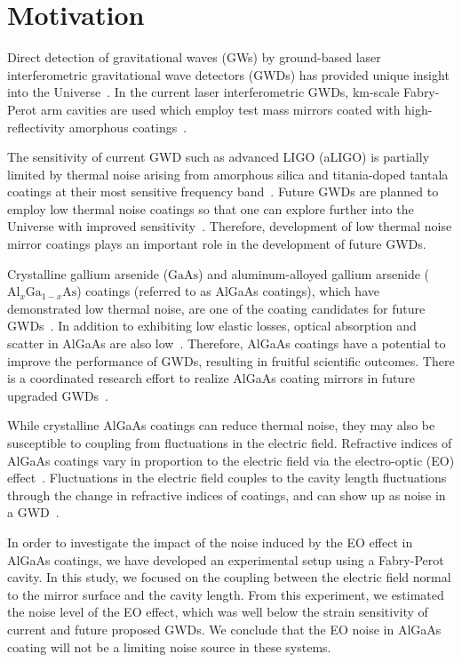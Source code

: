 \section{Motivation}
Direct detection of gravitational waves (GWs) by ground-based laser interferometric gravitational wave detectors (GWDs) has provided unique insight into the Universe~\cite{Abbott2016, gw170817, Abbott2021}.
In the current laser interferometric GWDs, km-scale Fabry-Perot arm cavities are used which employ test mass mirrors coated with high-reflectivity amorphous coatings~\cite{Degallaix2019, Granata2020}.

The sensitivity of current GWD such as advanced LIGO (aLIGO) is partially limited by thermal noise arising from amorphous silica and titania-doped tantala coatings at their most sensitive frequency band~\cite{harry:2006, Gras2018}.
Future GWDs are planned to employ low thermal noise coatings so that one can explore further into the Universe with improved sensitivity~\cite{Punturo_2010, Adhikari2020, CEHS, Srivastava2022}.
Therefore, development of low thermal noise mirror coatings plays an important role in the development of future GWDs.

Crystalline gallium arsenide ($\mathrm{GaAs}$) and aluminum-alloyed gallium arsenide ($\mathrm{Al}_{x}\mathrm{Ga}_{1-x}\mathrm{As}$) coatings (referred to as AlGaAs coatings), which have demonstrated low thermal noise, are one of the coating candidates for future GWDs~\cite{cole:2013, Penn2019}.
In addition to exhibiting low elastic losses, optical absorption and scatter in AlGaAs are also low~\cite{cole:2016, Winkler2021}.
Therefore, AlGaAs coatings have a potential to improve the performance of GWDs, resulting in fruitful scientific outcomes.
There is a coordinated research effort to realize AlGaAs coating mirrors in future upgraded GWDs~\cite{Chalermsongsak2016, Marchio:2018, Koch2019}.

While crystalline AlGaAs coatings can reduce thermal noise, they may also be susceptible to coupling from fluctuations in the electric field.
Refractive indices of AlGaAs coatings vary in proportion to the electric field via the electro-optic (EO) effect~\cite{Namba1961, yariv}.
Fluctuations in the electric field couples to the cavity length fluctuations through the change in refractive indices of coatings, and can show up as noise in a GWD~\cite{Abernathy, bonillafejer}.

In order to investigate the impact of the noise induced by the EO effect in AlGaAs coatings, we have developed an experimental setup using a Fabry-Perot cavity.
In this study, we focused on the coupling between the electric field normal to the mirror surface and the cavity length.
From this experiment, we estimated the noise level of the EO effect, which was well below the strain sensitivity of current and future proposed GWDs.
We conclude that the EO noise in AlGaAs coating will not be a limiting noise source in these systems.

